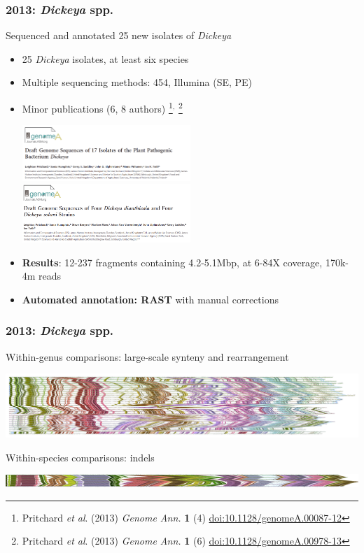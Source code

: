 \begin{frame}
  \frametitle{2013: \textit{Dickeya} spp.}
  Sequenced and annotated 25 new isolates of \textit{Dickeya}
  \begin{itemize}
    \item 25 \textit{Dickeya} isolates, at least six species
    \item Multiple sequencing methods: 454, Illumina (SE, PE)
    \item Minor publications (6, 8 authors)%
\footnote{\tiny{Pritchard \textit{et al}. (2013) \textit{Genome Ann.} \textbf{1} (4) \href{http://dx.doi.org/10.1128/genomeA.00087-12}{doi:10.1128/genomeA.00087-12}}}$^{,}$%
\footnote{\tiny{Pritchard \textit{et al}. (2013) \textit{Genome Ann.} \textbf{1} (6) \href{http://dx.doi.org/10.1128/genomeA.00978-13}{doi:10.1128/genomeA.00978-13}}}\\ 
      \begin{center}
        \includegraphics[width=0.5\textwidth]{images/dickeya_ga1}
        \includegraphics[width=0.5\textwidth]{images/dickeya_ga2}
      \end{center}    
    \item \textbf{Results}: 12-237  fragments containing 4.2-5.1Mbp, at 6-84X coverage, 170k-4m reads
    \item \textbf{Automated annotation: RAST} with manual corrections
  \end{itemize}  
\end{frame}

\begin{frame}
  \frametitle{2013: \textit{Dickeya} spp.}
  Within-genus comparisons: large-scale synteny and rearrangement
  \begin{center}
    \includegraphics[width=1\textwidth]{images/dickeya_core_collinear_small}
  \end{center}    
  Within-species comparisons: indels
  \begin{center}
    \includegraphics[width=1\textwidth]{images/collinear_zeae}
  \end{center}      
\end{frame}

